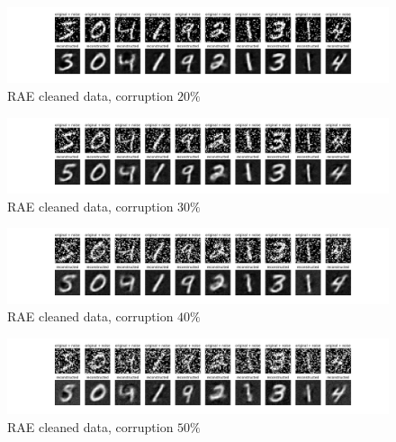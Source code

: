 \documentclass{beamer}
\theoremstyle{plain}
\theoremstyle{definition}
\theoremstyle{remark}
\begin{document}
\begin{frame}
	\begin{figure}
		\centering
		\includegraphics[width=0.95\linewidth]{Images/lam20.0corr0.2/RAE_recon.png}
		\caption[]{RAE cleaned data, corruption $20\%$}
	\end{figure}
\end{frame}

\begin{frame}
	\begin{figure}
		\centering
		\includegraphics[width=0.95\linewidth]{Images/lam20.0corr0.3/RAE_recon.png}
		\caption[]{RAE cleaned data, corruption $30\%$}
	\end{figure}
\end{frame}

\begin{frame}
	\begin{figure}
		\centering
		\includegraphics[width=0.95\linewidth]{Images/lam20.0corr0.4/RAE_recon.png}
		\caption[]{RAE cleaned data, corruption $40\%$}
	\end{figure}
\end{frame}

\begin{frame}
	\begin{figure}
		\centering
		\includegraphics[width=0.95\linewidth]{Images/lam20.0corr0.5/RAE_recon.png}
		\caption[]{RAE cleaned data, corruption $50\%$}
	\end{figure}
\end{frame}
\end{document}
